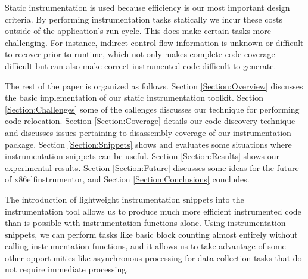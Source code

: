 


Static instrumentation is used because efficiency is our most important design 
criteria. By performing instrumentation tasks statically we incur these costs 
outside of the application's run cycle. This does make
certain tasks more challenging. For instance, indirect control flow information is unknown or
difficult to recover prior to runtime, which not only makes complete code
coverage difficult but can also make correct instrumented code difficult to
generate.

The rest of the paper is organized as follows. Section
\ref{Section:Overview} discusses the basic implementation of our static
instrumentation toolkit. Section \ref{Section:Challenges} some of the callenges discusses our
technique for performing code relocation. Section \ref{Section:Coverage} details
our code discovery technique and discusses issues pertaining to disassembly coverage of
our instrumentation package. Section \ref{Section:Snippets} shows and evaluates
some situations where instrumentation snippets can be useful. Section
\ref{Section:Results} shows our experimental results. Section
\ref{Section:Future} discusses some ideas for the future of x86elfinstrumentor,
and Section \ref{Section:Conclusions} concludes.

The introduction of lightweight instrumentation snippets into the
instrumentation tool allows us to produce much more
efficient instrumented code than is possible with instrumentation functions
alone. Using instrumentation snippets, we can perform tasks like basic block
counting almost entirely without calling instrumentation functions, and it
allows us to take advantage of some other opportunities like asynchronous
processing \cite{gao2005aliter} for data collection tasks that do not require
immediate processing.



